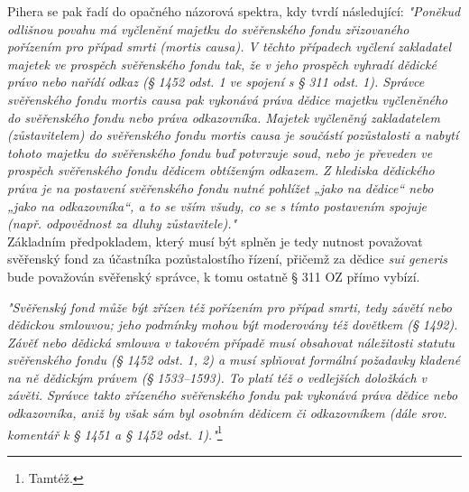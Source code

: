 \documentclass{article}
\begin{document}
 Pihera se pak řadí do opačného názorová spektra, kdy tvrdí následující: \textit{"Poněkud odlišnou povahu má vyčlenění majetku do svěřenského fondu zřizovaného pořízením pro případ smrti (mortis causa). V těchto případech vyčlení zakladatel majetek ve prospěch svěřenského fondu tak, že v jeho prospěch vyhradí dědické právo nebo nařídí odkaz (§ 1452 odst. 1 ve spojení s § 311 odst. 1). Správce svěřenského fondu mortis causa pak vykonává práva dědice majetku vyčleněného do svěřenského fondu nebo práva odkazovníka. Majetek vyčleněný zakladatelem (zůstavitelem) do svěřenského fondu mortis causa je součástí pozůstalosti a nabytí tohoto majetku do svěřenského fondu buď potvrzuje soud, nebo je převeden ve prospěch svěřenského fondu dědicem obtíženým odkazem. Z hlediska dědického práva je na postavení svěřenského fondu nutné pohlížet „jako na dědice“ nebo „jako na odkazovníka“, a to se vším všudy, co se s tímto postavením spojuje (např. odpovědnost za dluhy zůstavitele)."}\\
 
 Základním předpokladem, který musí být splněn je tedy nutnost považovat svěřenský fond za účastníka pozůstalostího řízení, přičemž za dědice \textit{sui generis} bude považován svěřenský správce, k tomu ostatně § 311 OZ přímo vybízí.
 
 
 \textit{"Svěřenský fond může být zřízen též pořízením pro případ smrti, tedy závětí nebo dědickou smlouvou; jeho podmínky mohou být moderovány též dovětkem (§ 1492). Závěť nebo dědická smlouva v takovém případě musí obsahovat náležitosti statutu svěřenského fondu (§ 1452 odst. 1, 2) a musí splňovat formální požadavky kladené na ně dědickým právem (§ 1533–1593). To platí též o vedlejších doložkách v závěti. Správce takto zřízeného svěřenského fondu pak vykonává práva dědice nebo odkazovníka, aniž by však sám byl osobním dědicem či odkazovníkem (dále srov. komentář k § 1451 a § 1452 odst. 1)."}\footnote{Tamtéž.}\\
 
\end{document}
